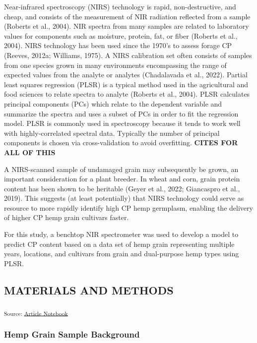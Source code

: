 \documentclass[
]{agujournal2019}
\begin{document}
Near-infrared spectroscopy (NIRS) technology is rapid, non-destructive,
and cheap, and consists of the measurement of NIR radiation reflected
from a sample (Roberts et al., 2004). NIR spectra from many samples are
related to laboratory values for components such as moisture, protein,
fat, or fiber (Roberts et al., 2004). NIRS technology has been used
since the 1970's to assess forage CP (Reeves, 2012a; Williams, 1975). A
NIRS calibration set often consists of samples from one species grown in
many environments encompassing the range of expected values from the
analyte or analytes (Chadalavada et al., 2022). Partial least squares
regression (PLSR) is a typical method used in the agricultural and food
sciences to relate spectra to analyte (Roberts et al., 2004). PLSR
calculates principal components (PCs) which relate to the dependent
variable and summarize the spectra and uses a subset of PCs in order to
fit the regression model. PLSR is commonly used in spectroscopy because
it tends to work well with highly-correlated spectral data. Typically
the number of principal components is chosen via cross-validation to
avoid overfitting. \textbf{CITES FOR ALL OF THIS}

A NIRS-scanned sample of undamaged grain may subsequently be grown, an
important consideration for a plant breeder. In wheat and corn, grain
protein content has been shown to be heritable (Geyer et al., 2022;
Giancaspro et al., 2019). This suggests (at least potentially) that NIRS
technology could serve as resource to more rapidly identify high CP hemp
germplasm, enabling the delivery of higher CP hemp grain cultivars
faster.

For this study, a benchtop NIR spectrometer was used to develop a model
to predict CP content based on a data set of hemp grain representing
multiple years, locations, and cultivars from grain and dual-purpose
hemp types using PLSR.

\subsection{MATERIALS AND METHODS}\label{materials-and-methods}

\textsubscript{Source:
\href{https://rvcrawford.github.io/glowing-system/index.qmd.html}{Article
Notebook}}

\subsubsection{Hemp Grain Sample
Background}\label{hemp-grain-sample-background}
\end{document}
